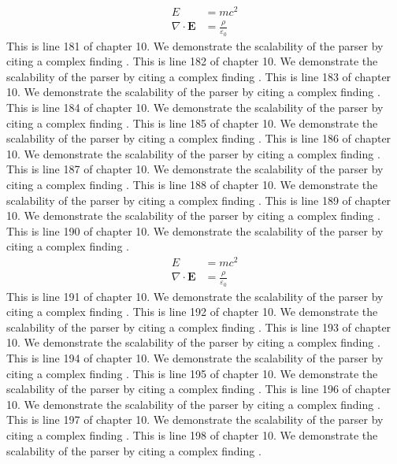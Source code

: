 \begin{align*}
  E &= mc^2 \\
  \nabla \cdot \mathbf{E} &= \frac{\rho}{\varepsilon_0}
\end{align*}
This is line 181 of chapter 10. We demonstrate the scalability of the parser by citing a complex finding \cite{ref10_181}.
This is line 182 of chapter 10. We demonstrate the scalability of the parser by citing a complex finding \cite{ref10_182}.
This is line 183 of chapter 10. We demonstrate the scalability of the parser by citing a complex finding \cite{ref10_183}.
This is line 184 of chapter 10. We demonstrate the scalability of the parser by citing a complex finding \cite{ref10_184}.
This is line 185 of chapter 10. We demonstrate the scalability of the parser by citing a complex finding \cite{ref10_185}.
This is line 186 of chapter 10. We demonstrate the scalability of the parser by citing a complex finding \cite{ref10_186}.
This is line 187 of chapter 10. We demonstrate the scalability of the parser by citing a complex finding \cite{ref10_187}.
This is line 188 of chapter 10. We demonstrate the scalability of the parser by citing a complex finding \cite{ref10_188}.
This is line 189 of chapter 10. We demonstrate the scalability of the parser by citing a complex finding \cite{ref10_189}.
This is line 190 of chapter 10. We demonstrate the scalability of the parser by citing a complex finding \cite{ref10_190}.
\begin{align*}
  E &= mc^2 \\
  \nabla \cdot \mathbf{E} &= \frac{\rho}{\varepsilon_0}
\end{align*}
This is line 191 of chapter 10. We demonstrate the scalability of the parser by citing a complex finding \cite{ref10_191}.
This is line 192 of chapter 10. We demonstrate the scalability of the parser by citing a complex finding \cite{ref10_192}.
This is line 193 of chapter 10. We demonstrate the scalability of the parser by citing a complex finding \cite{ref10_193}.
This is line 194 of chapter 10. We demonstrate the scalability of the parser by citing a complex finding \cite{ref10_194}.
This is line 195 of chapter 10. We demonstrate the scalability of the parser by citing a complex finding \cite{ref10_195}.
This is line 196 of chapter 10. We demonstrate the scalability of the parser by citing a complex finding \cite{ref10_196}.
This is line 197 of chapter 10. We demonstrate the scalability of the parser by citing a complex finding \cite{ref10_197}.
This is line 198 of chapter 10. We demonstrate the scalability of the parser by citing a complex finding \cite{ref10_198}.
